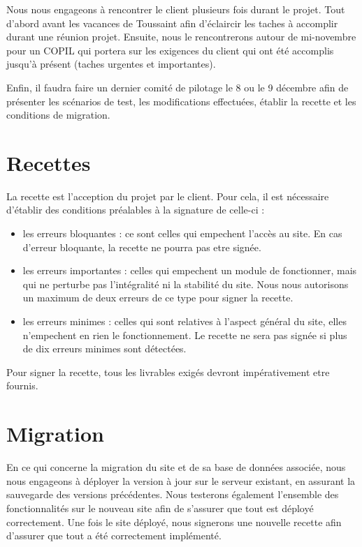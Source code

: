 \documentclass[11pt]{report}
\begin{document}
 \par Nous nous engageons à rencontrer le client plusieurs fois durant le
 projet. Tout d'abord avant les vacances de Toussaint afin d'éclaircir les
 taches à accomplir durant une réunion projet. Ensuite, nous le rencontrerons
 autour de mi-novembre pour un COPIL qui portera sur les exigences du client qui
 ont été accomplis jusqu'à présent (taches urgentes et importantes). 
 \par Enfin, il
 faudra faire un dernier comité de pilotage le 8 ou le 9 décembre afin de
 présenter les scénarios de test, les modifications effectuées, établir la
recette et les conditions de migration.
\section{Recettes}
 La recette est l'acception du projet par le client. Pour cela, il est
nécessaire d'établir des conditions préalables à la signature de celle-ci : \\
\begin{itemize}
 \item les erreurs bloquantes : ce sont celles qui empechent l'accès au site.
 En cas d'erreur bloquante, la recette ne pourra pas etre signée. \\
  \item les erreurs importantes : celles qui empechent un module de fonctionner,
  mais qui ne perturbe pas l'intégralité ni la stabilité du site. Nous nous
 autorisons un maximum de deux erreurs de ce type pour signer la recette. \\
  \item les erreurs minimes : celles qui sont relatives à l'aspect général du
  site, elles n'empechent en rien le fonctionnement. Le recette ne sera pas
  signée si plus de dix erreurs minimes sont détectées. \\
\end{itemize}

\par Pour signer la recette, tous les livrables exigés devront impérativement
etre fournis.

\section{Migration}
 En ce qui concerne la migration du site et de sa base de données associée, nous
 nous engageons à déployer la version à jour sur le serveur existant, en
 assurant la sauvegarde des versions précédentes. Nous testerons également
 l'ensemble des fonctionnalités sur le nouveau site afin de s'assurer que tout
 est déployé correctement.
 Une fois le site déployé, nous signerons une nouvelle recette afin d'assurer
que tout a été correctement implémenté.
\end{document}
